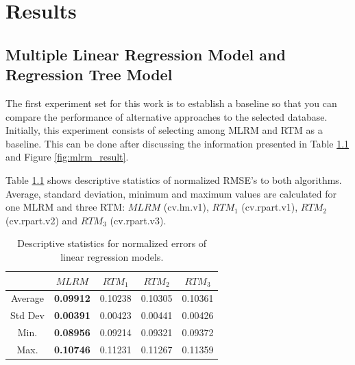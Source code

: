 \chapter{Results}\label{cap:results}

\section{Multiple Linear Regression Model and Regression Tree Model}

The first experiment set for this work is to establish a baseline so that you can compare the performance of alternative approaches to the selected database. Initially, this experiment consists of selecting among MLRM and RTM as a baseline. This can be done after discussing the information presented in Table \ref{tab:lm_descriptive} and Figure \ref{fig:mlrm_result}.

Table \ref{tab:lm_descriptive} shows descriptive statistics of normalized RMSE's to both algorithms. Average, standard deviation, minimum and maximum values are calculated for one MLRM and three RTM: $MLRM$ (cv.lm.v1), $RTM_1$ (cv.rpart.v1), $RTM_2$ (cv.rpart.v2) and $RTM_3$ (cv.rpart.v3).

\begin{table}[h]
\caption{Descriptive statistics for normalized errors of linear regression models.}\label{tab:lm_descriptive} \centering
\begin{tabular}{|c|c|c|c|c|}
  \hline
   & $MLRM$ & $RTM_1$ & $RTM_2$ & $RTM_3$ \\
  \hline
  Average & \textbf{0.09912} & 0.10238 & 0.10305 & 0.10361  \\
  \hline
  Std Dev & \textbf{0.00391} & 0.00423 & 0.00441 & 0.00426  \\
  \hline
  Min. & \textbf{0.08956} & 0.09214 & 0.09321 & 0.09372  \\
  \hline
  Max. & \textbf{0.10746} & 0.11231 & 0.11267 & 0.11359  \\
  \hline
\end{tabular}
\end{table}

